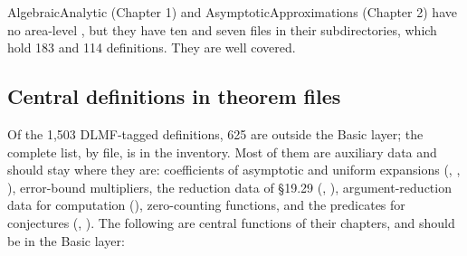 \documentclass[11pt,a4paper]{article}
\begin{document}
AlgebraicAnalytic (Chapter 1) and AsymptoticApproximations (Chapter 2) have no area-level
, but they have ten and seven  files in their subdirectories,
which hold 183 and 114 definitions. They are well covered.

\subsection{Central definitions in theorem files}

Of the 1{,}503 DLMF-tagged definitions, 625 are outside the Basic layer; the complete list, by
file, is in the inventory. Most of them are auxiliary data and should stay where they are:
coefficients of asymptotic and uniform expansions (, ,
), error-bound multipliers, the reduction data of §19.29
(, ), argument-reduction data for computation
(), zero-counting functions, and the predicates for conjectures
(, ). The following are central functions of
their chapters, and should be in the Basic layer:
\end{document}
